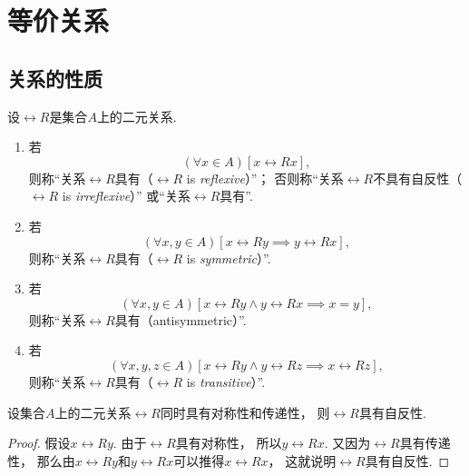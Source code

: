 \section{等价关系}
\subsection{关系的性质}
\begin{definition}
设\(\rel{R}\)是集合\(A\)上的二元关系.
\begin{enumerate}
	\item 若\begin{equation*}
		(\forall x \in A)
		[x\rel{R}x],
	\end{equation*}
	则称“关系\(\rel{R}\)具有（\(\rel{R}\) is \emph{reflexive}）”；
	否则称“关系\(\rel{R}\)不具有自反性（\(\rel{R}\) is \emph{irreflexive}）”
	或“关系\(\rel{R}\)具有”.

	\item 若\begin{equation*}
		(\forall x,y \in A)
		[x\rel{R}y \implies y\rel{R}x],
	\end{equation*}
	则称“关系\(\rel{R}\)具有（\(\rel{R}\) is \emph{symmetric}）”.

	\item 若\begin{equation*}
		(\forall x,y \in A)
		[x\rel{R}y \land y\rel{R}x \implies x = y],
	\end{equation*}
	则称“关系\(\rel{R}\)具有（antisymmetric）”.

	\item 若\begin{equation*}
		(\forall x,y,z \in A)
		[x\rel{R}y \land y\rel{R}z \implies x\rel{R}z],
	\end{equation*}
	则称“关系\(\rel{R}\)具有（\(\rel{R}\) is \emph{transitive}）”.
\end{enumerate}
\end{definition}

\begin{proposition}
设集合\(A\)上的二元关系\(\rel{R}\)同时具有对称性和传递性，
则\(\rel{R}\)具有自反性.
\begin{proof}
假设\(x\rel{R}y\).
由于\(\rel{R}\)具有对称性，
所以\(y\rel{R}x\).
又因为\(\rel{R}\)具有传递性，
那么由\(x\rel{R}y\)和\(y\rel{R}x\)可以推得\(x\rel{R}x\)，
这就说明\(\rel{R}\)具有自反性.
\end{proof}
\end{proposition}

